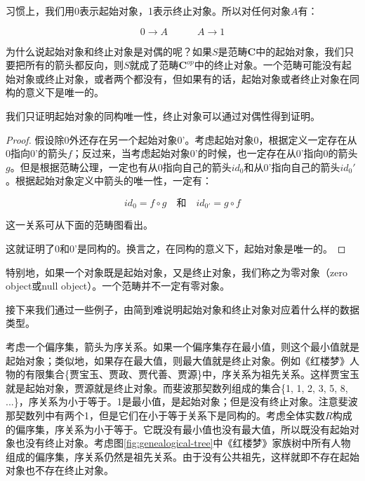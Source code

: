 \documentclass{article}
\begin{document}
习惯上，我们用0表示起始对象，1表示终止对象。所以对任何对象$A$有：

\[
  0 \longrightarrow A \quad \quad \quad A \longrightarrow 1
\]

为什么说起始对象和终止对象是对偶的呢？如果$S$是范畴$\pmb{C}$中的起始对象，我们只要把所有的箭头都反向，则$S$就成了范畴$\pmb{C}^{op}$中的终止对象。一个范畴可能没有起始对象或终止对象，或者两个都没有，但如果有的话，起始对象或者终止对象在同构的意义下是唯一的。

我们只证明起始对象的同构唯一性，终止对象可以通过对偶性得到证明。

\begin{proof}
假设除0外还存在另一个起始对象0'。考虑起始对象0，根据定义一定存在从0指向0'的箭头$f$；反过来，当考虑起始对象0'的时候，也一定存在从0'指向0的箭头$g$。但是根据范畴公理，一定也有从0指向自己的箭头$id_0$和从0'指向自己的箭头$id_0'$。根据起始对象定义中箭头的唯一性，一定有：

\[
  id_0 = f \circ g \quad \text{和} \quad id_{0'} = g \circ f
\]

这一关系可从下面的范畴图看出。

\begin{center}
\end{center}

这就证明了0和0'是同构的。换言之，在同构的意义下，起始对象是唯一的。
\end{proof}

特别地，如果一个对象既是起始对象，又是终止对象，我们称之为零对象（zero object或null object）。一个范畴并不一定有零对象。

接下来我们通过一些例子，由简到难说明起始对象和终止对象对应着什么样的数据类型。

\begin{example}
考虑一个偏序集，箭头为序关系。如果一个偏序集存在最小值，则这个最小值就是起始对象；类似地，如果存在最大值，则最大值就是终止对象。例如《红楼梦》人物的有限集合\{贾宝玉、贾政、贾代善、贾源\}中，序关系为祖先关系。这样贾宝玉就是起始对象，贾源就是终止对象。而斐波那契数列组成的集合\{1, 1, 2, 3, 5, 8, ...\}，序关系为小于等于。1是最小值，是起始对象；但是没有终止对象。注意斐波那契数列中有两个1，但是它们在小于等于关系下是同构的。考虑全体实数$R$构成的偏序集，序关系为小于等于。它既没有最小值也没有最大值，所以既没有起始对象也没有终止对象。考虑图\ref{fig:genealogical-tree}中《红楼梦》家族树中所有人物组成的偏序集，序关系仍然是祖先关系。由于没有公共祖先，这样就即不存在起始对象也不存在终止对象。
\end{example}
\end{document}
